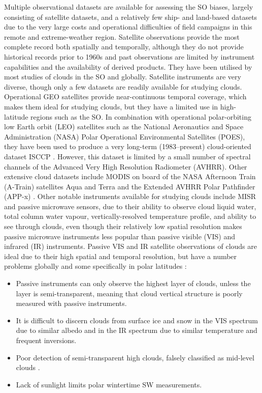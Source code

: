 Multiple observational datasets are available for assessing the SO biases,
largely consisting of satellite datasets, and a relatively few ship- and
land-based datasets due to the very large costs and operational difficulties
of field campaigns in this remote and extreme-weather region. 
Satellite observations provide the most complete record both spatially and
temporally, although they do not provide historical records prior to
1960s and past observations are limited by instrument capabilities and
the availability of derived products. They have been utilised by most studies
of clouds in the SO and globally. Satellite instruments are very diverse, though only a few
datasets are readily available for studying clouds.
Operational GEO satellites provide near-continuous temporal
coverage,
which makes them ideal for studying clouds, but they have a limited use in
high-latitude regions such as the SO. In combination with operational polar-orbiting
low Earth orbit (LEO) satellites such as the National Aeronautics and Space Administration (NASA)
Polar Operational Environmental Satellites (POES),
they have been used to produce a very long-term (1983--present) cloud-oriented
dataset ISCCP
\citep{schiffer1983}. However, this dataset is limited by
a small number of spectral channels of the Advanced Very High Resolution Radiometer
(AVHRR). Other extensive
cloud datasets include MODIS
on board of the NASA Afternoon Train (A-Train) satellites Aqua and Terra
and the Extended AVHRR Polar Pathfinder (APP-x) \citep{meier1997}. Other notable instruments available
for studying clouds include MISR
and passive
microwave sensors, due to their ability to observe cloud liquid water,
total column water vapour, vertically-resolved temperature profile, and
ability to see through clouds, even though their relatively low spatial
resolution makes passive microwave instruments less popular than passive visible (VIS) and infrared (IR)
instruments.
Passive VIS and IR satellite observations of clouds are ideal due to their high
spatial and temporal resolution, but have a number problems globally and some
specifically in polar latitudes \citep{bromwich2012}:

\begin{itemize}
\item Passive instruments can only observe the highest layer of clouds, unless
the layer is semi-transparent, meaning that cloud vertical structure is
poorly measured with passive instruments.
\item It is difficult to discern clouds from surface ice and snow
in the VIS spectrum due to similar albedo and in the IR
spectrum due to similar
temperature and frequent inversions.
\item Poor detection of semi-transparent high clouds, falsely classified as
mid-level clouds \citep{haynes2011}.
\item Lack of sunlight limits polar wintertime SW measurements.
\end{itemize}

